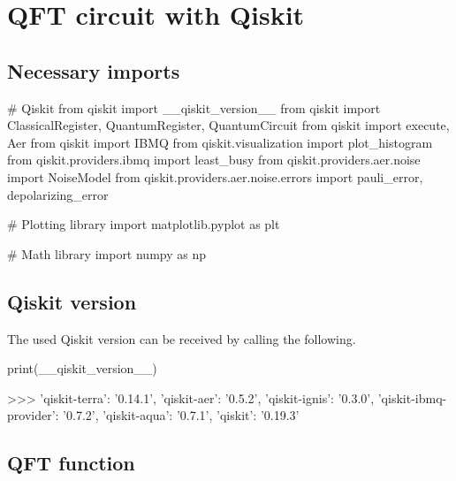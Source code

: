 \section{QFT circuit with Qiskit}
\label{sec:qft-circuit-qiskit}

\subsection{Necessary imports}
\label{subsec:qft-circuit-qiskit-necessary-imports}

\begin{python}
# Qiskit
from qiskit import __qiskit_version__
from qiskit import ClassicalRegister, QuantumRegister, QuantumCircuit
from qiskit import execute, Aer
from qiskit import IBMQ
from qiskit.visualization import plot_histogram
from qiskit.providers.ibmq import least_busy
from qiskit.providers.aer.noise import NoiseModel
from qiskit.providers.aer.noise.errors import pauli_error, depolarizing_error

# Plotting library
import matplotlib.pyplot as plt

# Math library
import numpy as np
\end{python}

\subsection{Qiskit version}
\label{subsec:qiskit-version}

The used Qiskit version can be received by calling the following.

\begin{python}
print(__qiskit_version__)

>>> {'qiskit-terra': '0.14.1',
'qiskit-aer': '0.5.2',
'qiskit-ignis': '0.3.0',
'qiskit-ibmq-provider': '0.7.2',
'qiskit-aqua': '0.7.1',
'qiskit': '0.19.3'}
\end{python}

\subsection{QFT function}
\label{subsec:qft-function}

